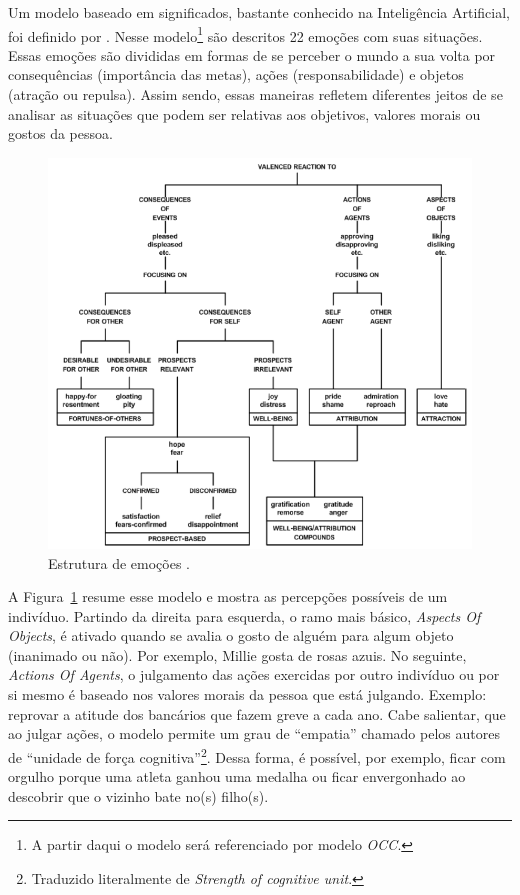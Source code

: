 Um modelo baseado em significados, bastante conhecido na Inteligência
Artificial, foi definido por \citet{ortony1988cse}. Nesse modelo\footnote{A
partir daqui o modelo será referenciado por modelo \emph{OCC}.} são descritos
22 emoções com suas situações. Essas emoções são divididas em formas de se
perceber o mundo a sua volta por consequências (importância das metas),
ações (responsabilidade) e objetos (atração ou repulsa). Assim sendo,
essas maneiras refletem diferentes jeitos de se
analisar as situações que podem ser relativas aos objetivos, valores morais ou
gostos da pessoa.

\begin{figure}[t]
  \centering
    \includegraphics[width=128mm]{figuras/occ.png}
  \caption[Estrutura de emoções.]{Estrutura de emoções \cite{ortony1988cse}.}
  \label{fig:occ_model}
\end{figure}

A Figura~\ref{fig:occ_model} resume esse modelo e mostra as
percepções possíveis de um indivíduo.  Partindo da direita para esquerda, o
ramo mais básico, \emph{Aspects Of Objects}, é ativado quando se avalia o
gosto de alguém para algum objeto (inanimado ou não). Por exemplo, Millie
gosta de rosas azuis. No seguinte, \emph{Actions Of Agents}, o julgamento das
ações exercidas por outro indivíduo ou por si mesmo é baseado nos
valores morais da pessoa que está julgando. Exemplo: reprovar a atitude dos
bancários que fazem greve a cada ano. Cabe salientar, que ao julgar ações, o
modelo permite um grau de ``empatia'' chamado pelos autores de ``unidade de
força cognitiva''\footnote{Traduzido literalmente de \emph{Strength of
cognitive unit}.}. Dessa forma, é possível, por exemplo, ficar com orgulho
porque uma atleta ganhou uma medalha ou ficar envergonhado ao descobrir que o
vizinho bate no(s) filho(s).

